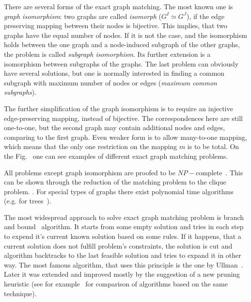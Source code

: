 There are several forms of the exact graph matching. The most known one is \emph{graph isomorphism}: two graphs are called \emph{isomorph} ($G^I\simeq G^J$), if the edge preserving mapping between their nodes is bijective. This implies, that two graphs have the equal number of nodes. If it is not the case, and the isomorphism holds between the one graph and a node-induced subgraph of the other graphs, the problem is called \emph{subgraph isomorphism}. Its further extension is a isomorphism between subgraphs of the graphs. The last problem can obviously have several solutions, but one is normally interested in finding a common subgraph with maximum number of nodes or edges (\emph{maximum common subgraphs}).  

The further simplification of the graph isomorphism is to require an injective edge-preserving mapping, instead of bijective. The correspondences here are still one-to-one, but the second graph may contain additional nodes and edges, comparing to the first graph.
Even weaker form is to allow many-to-one mapping, which means that the only one restriction on the mapping $m$ is to be total.
On the Fig.~ one can see examples of different exact graph matching problems.

All problems except graph isomorphism are proofed to be $NP-$complete~\cite{Garey_NPComplet}. This can be shown through the reduction of the matching problem to the clique problem. . For special types of graphs there exist polynomial time algorithms (e.g. for %
trees~\cite{Aho_Ullman, Garey_NPComplet}).

The most widespread approach to solve exact graph matching problem is branch and bound~\cite{Reingold} algorithm. It starts from some empty solution and tries in each step to expend it's current known solution based on some rules. If it happens, that a current solution does not fulfill problem's constraints, the solution is cut and algorithm backtracks to the last feasible solution and tries to expand it in other way. The most famous algorithm, that uses this principle is the one by Ullman~\cite{Ullmann}. Later it was extended and improved mostly by the suggestion of a new pruning heuristic (see for example~\cite{Lee2013} for comparison of algorithms based on the same technique). 

